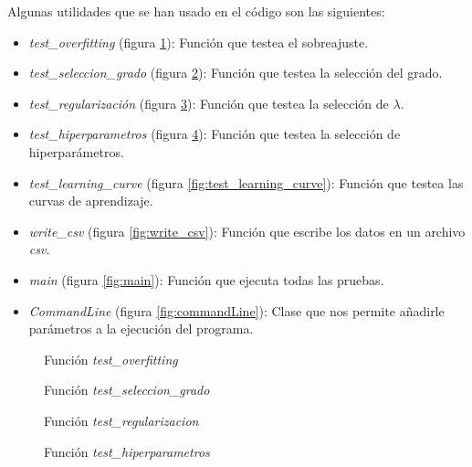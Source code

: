 \documentclass[6pt]{../../shared/AiTex}
\begin{document}
Algunas utilidades que se han usado en el código son las siguientes:
\begin{itemize}
    \item \textit{test\_overfitting} (figura \ref{fig:test_overfitting}): Función que testea el sobreajuste.
    \item \textit{test\_seleccion\_grado} (figura \ref{fig:test_seleccion_grado}): Función que testea la selección del grado.
    \item \textit{test\_regularización} (figura \ref{fig:test_regularizacion}): Función que testea la selección de $\lambda$.
    \item \textit{test\_hiperparametros} (figura \ref{fig:test_hiperparametros}): Función que testea la selección de hiperparámetros.
    \item \textit{test\_learning\_curve} (figura \ref{fig:test_learning_curve}): Función que testea las curvas de aprendizaje.
    \item \textit{write\_csv} (figura \ref{fig:write_csv}): Función que escribe los datos en un archivo \textit{csv}.
    \item \textit{main} (figura \ref{fig:main}): Función que ejecuta todas las pruebas.
    \item \textit{CommandLine} (figura \ref{fig:commandLine}): Clase que nos permite añadirle parámetros a la ejecución del programa.
\end{itemize}

\begin{figure}[H]
    \centering
    
    \caption{Función \textit{test\_overfitting}}
    \label{fig:test_overfitting}
\end{figure}

\begin{figure}[H]
    \centering
    
    \caption{Función \textit{test\_seleccion\_grado}}
    \label{fig:test_seleccion_grado}
\end{figure}

\begin{figure}[H]
    \centering
    
    \caption{Función \textit{test\_regularizacion}}
    \label{fig:test_regularizacion}
\end{figure}

\begin{figure}[H]
    \centering
    
    \caption{Función \textit{test\_hiperparametros}}
    \label{fig:test_hiperparametros}
\end{figure}
\end{document}
